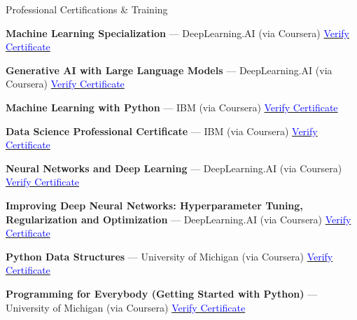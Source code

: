 \begin{rubric}{Professional Certifications \& Training}

\entry* \textbf{Machine Learning Specialization} — DeepLearning.AI (via Coursera)  
\href{https://coursera.org/share/bbc515ff95ad8277951d1b05fafd3c4e}{\textcolor{blue}{Verify Certificate}}

\entry* \textbf{Generative AI with Large Language Models} — DeepLearning.AI (via Coursera)  
\href{https://coursera.org/verify/38NY9GKSBAU8}{\textcolor{blue}{Verify Certificate}}

\entry* \textbf{Machine Learning with Python} — IBM (via Coursera)  
\href{https://coursera.org/verify/NXKVEXU4TSR5}{\textcolor{blue}{Verify Certificate}}

\entry* \textbf{Data Science Professional Certificate} — IBM (via Coursera)  
\href{https://coursera.org/verify/ZRWAXS8C6DYW}{\textcolor{blue}{Verify Certificate}}

\entry* \textbf{Neural Networks and Deep Learning} — DeepLearning.AI (via Coursera)  
\href{https://coursera.org/verify/N5CQEJ7NTFGD}{\textcolor{blue}{Verify Certificate}}

\entry* \textbf{Improving Deep Neural Networks: Hyperparameter Tuning, Regularization and Optimization} — DeepLearning.AI (via Coursera)  
\href{https://coursera.org/verify/ERHN7AAM4BDG}{\textcolor{blue}{Verify Certificate}}

\entry* \textbf{Python Data Structures} — University of Michigan (via Coursera)  
\href{https://www.coursera.org/account/accomplishments/verify/2TL5G3JBMUMF}{\textcolor{blue}{Verify Certificate}}

\entry* \textbf{Programming for Everybody (Getting Started with Python)} — University of Michigan (via Coursera)  
\href{https://www.coursera.org/account/accomplishments/verify/2N35KET5ZE73}{\textcolor{blue}{Verify Certificate}}

\end{rubric}